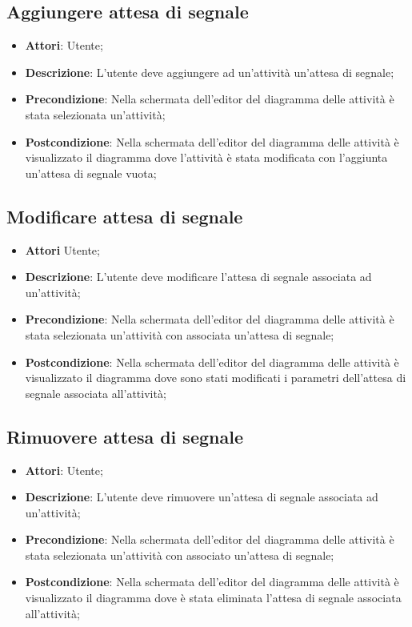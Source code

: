 \documentclass[../AnalisiDeiRequisiti.tex]{subfiles}
\begin{document}
	\subsection{Aggiungere attesa di segnale}
	\begin{itemize}
		\item \textbf{Attori}: Utente;
		\item \textbf{Descrizione}: L'utente deve aggiungere ad un'attività un'attesa di segnale;
		\item \textbf{Precondizione}: Nella schermata dell'editor del diagramma delle attività è stata selezionata un'attività;
		\item \textbf{Postcondizione}: Nella schermata dell'editor del diagramma delle attività è visualizzato il diagramma dove l'attività è stata modificata con l'aggiunta un'attesa di segnale vuota;
	\end{itemize}
	
	\subsection{Modificare attesa di segnale}
	\begin{itemize}
		\item \textbf{Attori} Utente;
		\item \textbf{Descrizione}:  L'utente deve modificare l'attesa di segnale associata ad un'attività;
		\item \textbf{Precondizione}: Nella schermata dell'editor del diagramma delle attività è stata selezionata un'attività con associata un'attesa di segnale;
		\item \textbf{Postcondizione}: Nella schermata dell'editor del diagramma delle attività è visualizzato il diagramma dove sono stati modificati i parametri dell'attesa di segnale associata all'attività;
	\end{itemize}
	
	\subsection{Rimuovere attesa di segnale}
	\begin{itemize}
		\item \textbf{Attori}: Utente;
		\item \textbf{Descrizione}: L'utente deve rimuovere un'attesa di segnale associata ad un'attività;
		\item \textbf{Precondizione}: Nella schermata dell'editor del diagramma delle attività è stata selezionata un'attività con associato un'attesa di segnale;
		\item \textbf{Postcondizione}: Nella schermata dell'editor del diagramma delle attività è visualizzato il diagramma dove è stata eliminata l'attesa di segnale associata all'attività;
	\end{itemize}
\end{document}
